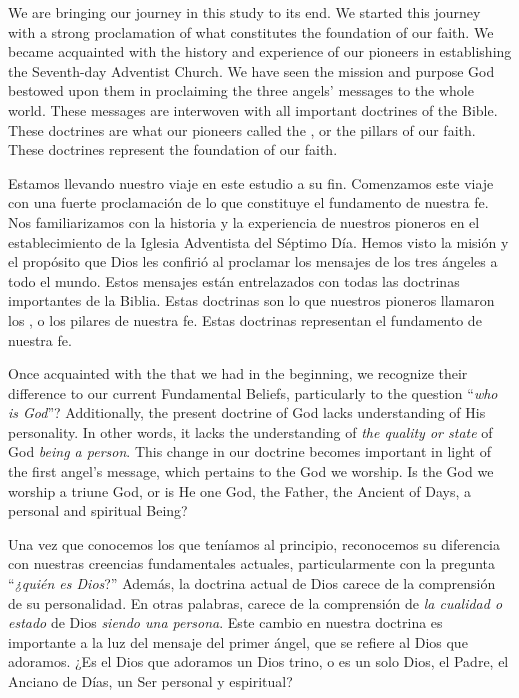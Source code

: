 



We are bringing our journey in this study to its end. We started this journey with a strong proclamation of what constitutes the foundation of our faith. We became acquainted with the history and experience of our pioneers in establishing the Seventh-day Adventist Church. We have seen the mission and purpose God bestowed upon them in proclaiming the three angels’ messages to the whole world. These messages are interwoven with all important doctrines of the Bible. These doctrines are what our pioneers called the , or the pillars of our faith. These doctrines represent the foundation of our faith.


Estamos llevando nuestro viaje en este estudio a su fin. Comenzamos este viaje con una fuerte proclamación de lo que constituye el fundamento de nuestra fe. Nos familiarizamos con la historia y la experiencia de nuestros pioneros en el establecimiento de la Iglesia Adventista del Séptimo Día. Hemos visto la misión y el propósito que Dios les confirió al proclamar los mensajes de los tres ángeles a todo el mundo. Estos mensajes están entrelazados con todas las doctrinas importantes de la Biblia. Estas doctrinas son lo que nuestros pioneros llamaron los , o los pilares de nuestra fe. Estas doctrinas representan el fundamento de nuestra fe.


Once acquainted with the  that we had in the beginning, we recognize their difference to our current Fundamental Beliefs, particularly to the question “\textit{who is God}”? Additionally, the present doctrine of God lacks understanding of His personality. In other words, it lacks the understanding of \textit{the quality or state} of God \textit{being a person}. This change in our doctrine becomes important in light of the first angel’s message, which pertains to the God we worship. Is the God we worship a triune God, or is He one God, the Father, the Ancient of Days, a personal and spiritual Being?


Una vez que conocemos los  que teníamos al principio, reconocemos su diferencia con nuestras creencias fundamentales actuales, particularmente con la pregunta “\textit{¿quién es Dios}?” Además, la doctrina actual de Dios carece de la comprensión de su personalidad. En otras palabras, carece de la comprensión de \textit{la cualidad o estado} de Dios \textit{siendo una persona}. Este cambio en nuestra doctrina es importante a la luz del mensaje del primer ángel, que se refiere al Dios que adoramos. ¿Es el Dios que adoramos un Dios trino, o es un solo Dios, el Padre, el Anciano de Días, un Ser personal y espiritual?


